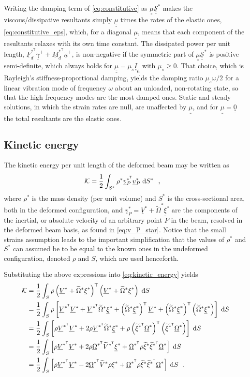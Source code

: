 \documentclass[12pt,a4paper,oneside,english]{abntex2} %
\newcommand{\fix}[1]{{\color{red}#1}}
\newcommand{\vect}[1]{\underline{#1}}
\def\tens#1{\underline{\underline{#1}}}
\def\til#1{\widetilde{#1}}
\def\lb{\left[}
\def\rb{\right]}
\def\lp{\left(}
\def\rp{\right)}
\def\T{\mathsf{T}}
\def\vP{\vect{v}_P}
\def\vPs{\vP^{*}}
\def\vPsT{\vP^{*^\T}}
\def\gam{\vect{\gamma}}
\def\gampdot{\dot{\gam}^{+}}
\def\kap{\vect{\kappa}}
\def\kappdot{\dot{\kap}^{+}}
\def\xis{\vect{\xi}^{*}}
\def\xitils{\til{\xi}^{*}}
\def\xitilsT{\til{\xi}^{*^\T}}
\def\V{\vect{V}}
\def\Vs{\V^{*}}
\def\VsT{\V^{*^\T}}
\def\Vtils{\til{V}^{*}}
\def\VtilsT{\til{V}^{*^\T}}
\def\Om{\vect{\Omega}}
\def\Oms{\Om^{*}}
\def\OmsT{\Om^{*^\T}}
\def\Omtil{\til{\Omega}}
\def\Omtils{\Omtil^{*}}
\def\F{\vect{F}}
\def\M{\vect{M}}
\def\d{\textnormal{d}}
\def\Stiff{\mathcal{\tens{S}}^*}
\def\FsdT{\F_d^{*^\T}}
\def\MsdT{\M_d^{*^\T}}
\begin{document}
\fix{Writing the damping term of \cref{eq:constitutive} as $\tens{\mu}\Stiff$ makes the viscous/dissipative resultants simply $\tens{\mu}$ times the rates of the elastic ones, \cref{eq:constitutive_eps}, which, for a diagonal $\tens{\mu}$, means that each component of the resultants relaxes with its own time constant. The dissipated power per unit length, $\FsdT\gampdot+\MsdT\kappdot$, is non-negative if the symmetric part of $\tens{\mu}\Stiff$ is positive semi-definite, which always holds for $\tens{\mu}=\mu_s\tens{I}_6$ with $\mu_s\geq0$. That choice, which is Rayleigh's stiffness-proportional damping, yields the damping ratio $\mu_s\omega/2$ for a linear vibration mode of frequency $\omega$ about an unloaded, non-rotating state, so that the high-frequency modes are the most damped ones. Static and steady solutions, in which the strain rates are null, are unaffected by $\tens{\mu}$, and for $\tens{\mu}=\tens{0}$ the total resultants are the elastic ones.}

\subsection{Kinetic energy}

The kinetic energy per unit length of the deformed beam may be written as
\begin{align}
    \mathcal{K} &= \frac{1}{2}\int_{S^*}\rho^*\vPsT\vPs\;\d S^* \ \ ,
    \label{eq:kinetic_energy}
\end{align}
where $\rho^*$ is the mass density (per unit volume) and $S^*$ is the cross-sectional area, both in the deformed configuration, and $\vPs = \Vs + \Omtils\xis$ are the components of the inertial, or absolute velocity of an arbitrary point $P$ in the beam, resolved in the deformed beam basis, as found in \cref{eq:v_P_star}. Notice that the small strains assumption leads to the important simplification that the values of $\rho^*$ and $S^*$ can assumed be to be equal to the known ones in the undeformed configuration, denoted $\rho$ and $S$, which are used henceforth. 

Substituting the above expressions into \cref{eq:kinetic_energy} yields
\begin{align}
    \mathcal{K} &= \frac{1}{2}\int_S \rho\lp\Vs + \Omtils\xis\rp^\T\lp\Vs + \Omtils\xis\rp \;\d S \nonumber 
    \\
    &= \frac{1}{2}\int_S \rho\lb \VsT\Vs + \VsT\Omtils\xis + \lp\Omtils\xis\rp^\T\Vs + \lp\Omtils\xis\rp^\T\lp\Omtils\xis\rp \rb\;\d S \nonumber 
    \\
    &= \frac{1}{2}\int_S \lb \rho\VsT\Vs + 2\rho\VsT\Omtils\xis + \rho \lp\xitilsT\Oms\rp^\T\lp\xitilsT\Oms\rp \rb\;\d S \nonumber 
    \\
    &= \frac{1}{2}\int_S \lb \rho\VsT\Vs + 2\rho\OmsT\VtilsT\xis +  \OmsT\rho\xitils\xitilsT\Oms \rb\;\d S \nonumber 
    \\
    &= \frac{1}{2}\int_S \lb \rho\VsT\Vs - 2\OmsT\Vtils\rho\xis +  \OmsT\rho\xitils\xitilsT\Oms \rb\;\d S \ \ .
    \label{eq:kinetic_energy_expanded}
\end{align}
\end{document}
